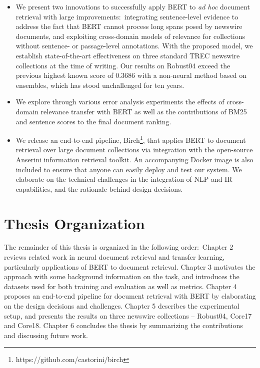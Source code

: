 \begin{itemize}
\item
We present two innovations to successfully apply BERT to \textit{ad hoc} document retrieval with large improvements:\
integrating sentence-level evidence to address the fact that BERT cannot process long spans posed by newswire documents, and exploiting cross-domain models of relevance for collections without sentence- or passage-level annotations.
With the proposed model, we establish state-of-the-art effectiveness on three standard TREC newswire collections at the time of writing.
Our results on Robust04 exceed the previous highest known score of 0.3686 \cite{Cormack:2009:RRF:1571941.1572114} with a non-neural method based on ensembles, which has stood unchallenged for ten years.
\item
We explore through various error analysis experiments the effects of cross-domain relevance transfer with BERT as well as the contributions of BM25 and sentence scores to the final document ranking.
\myworries{Elaborate more?}
\item
We release an end-to-end pipeline, Birch\footnote{https://github.com/castorini/birch}, that applies BERT to document retrieval over large document collections via integration with the open-source Anserini information retrieval toolkit.
An accompanying Docker image is also included to ensure that anyone can easily deploy and test our system.
We elaborate on the technical challenges in the integration of NLP and IR capabilities, and the rationale behind design decisions.
\end{itemize}

\section{Thesis Organization}

The remainder of this thesis is organized in the following order:\
Chapter 2 reviews related work in neural document retrieval and transfer learning, particularly applications of BERT to document retrieval.
Chapter 3 motivates the approach with some background information on the task, and introduces the datasets used for both training and evaluation as well as metrics.
Chapter 4 proposes an end-to-end pipeline for document retrieval with BERT by elaborating on the design decisions and challenges.
Chapter 5 describes the experimental setup, and presents the results on three newswire collections -- Robust04, Core17 and Core18.
Chapter 6 concludes the thesis by summarizing the contributions and discussing future work.